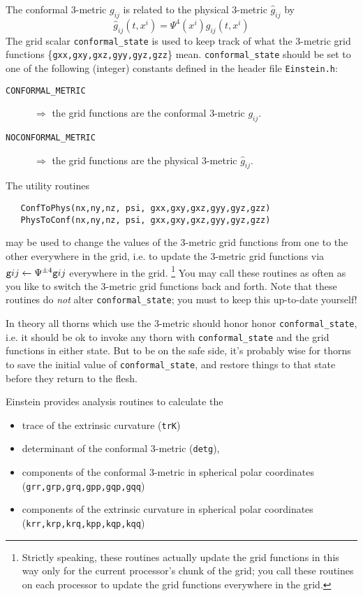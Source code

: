 \documentclass{article}
\begin{document}
The conformal 3-metric $g_{ij}$ is related to the physical 3-metric
$\hat{g}_{ij}$ by 
$$
\hat{g}_{ij}(t,x^i) = \Psi^4(x^i) g_{ij}(t,x^i)
$$
The grid scalar {\tt conformal\_state} is used to keep track of
what the 3-metric grid functions \{{\tt gxx,gxy,gxz,gyy,gyz,gzz}\}
mean.  {\tt conformal\_state} should be set to one of the following
(integer) constants defined in the header file {\tt Einstein.h}:
\begin{description}
\item[{\tt CONFORMAL\_METRIC}]
	$\Rightarrow$ the grid functions are the conformal 3-metric
	$g_{ij}$.
\item[{\tt NOCONFORMAL\_METRIC}]
	$\Rightarrow$ the grid functions are the physical 3-metric
	$\hat{g}_{ij}$.
\end{description}

The utility routines
\begin{verbatim}
   ConfToPhys(nx,ny,nz, psi, gxx,gxy,gxz,gyy,gyz,gzz)
   PhysToConf(nx,ny,nz, psi, gxx,gxy,gxz,gyy,gyz,gzz)
\end{verbatim}
may be used to change the values of the 3-metric grid functions
from one to the other everywhere in the grid, i.e.{} to update the
3-metric grid functions via ${\tt g}ij \leftarrow \Psi^{\pm 4} {\tt g}ij$
everywhere in the grid.%
\footnote{%
	 Strictly speaking, these routines actually update
	 the grid functions in this way only for the current
	 processor's chunk of the grid; you call these
	 routines on each processor to update the grid
	 functions everywhere in the grid.%
	 }%
{}  You may call these routines as often as you like to switch the
3-metric grid functions back and forth.  Note that these routines
do {\em not\/} alter {\tt conformal\_state}; you must to keep this
up-to-date yourself!

In theory all thorns which use the 3-metric should honor honor
{\tt conformal\_state}, i.e. it should be ok to invoke any thorn
with {\tt conformal\_state} and the grid functions in either state.
But to be on the safe side, it's probably wise for thorns to save
the initial value of {\tt conformal\_state}, and restore things to
that state before they return to the flesh.

Einstein provides analysis routines to calculate the
\begin{itemize}
\item	trace of the extrinsic curvature ({\tt trK})
\item	determinant of the conformal 3-metric ({\tt detg}),
\item	components of the conformal 3-metric in 
	spherical polar coordinates ({\tt grr,grp,grq,gpp,gqp,gqq})
\item	components of the extrinsic curvature in 
	spherical polar coordinates ({\tt krr,krp,krq,kpp,kqp,kqq})
\end{itemize}
\end{document}
